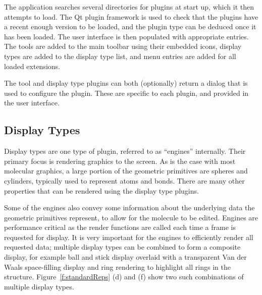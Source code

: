 \documentclass[10pt]{bmc_article}
\newenvironment{bmcformat}{\begin{raggedright}
\baselineskip20pt\sloppy\setboolean{publ}{false}}{\end{raggedright}
\baselineskip20pt\sloppy}
\begin{document}
\begin{bmcformat}
The application searches several directories for plugins at start up,
which it then attempts to load. The Qt plugin framework is used to check that
the plugins have a recent enough version to be loaded, and the plugin type can
be deduced once it has been loaded. The user interface is then populated with
appropriate entries. The tools are added to the main toolbar using their
embedded icons, display types are added to the display type list, and menu
entries are added for all loaded extensions.

The tool and display type plugins can both (optionally) return a dialog that is
used to configure the plugin. These are specific to each plugin, and provided in
the user interface.

\subsection{Display Types}

Display types are one type of plugin, referred to as ``engines'' internally. Their
primary focus is rendering graphics to the screen. As is the case with most
molecular graphics, a large portion of the geometric primitives are spheres and
cylinders, typically used to represent atoms and bonds. There are many other
properties that can be rendered using the display type plugins.

Some of the engines also convey some information about the underlying data the
geometric primitives represent, to allow for the molecule to be edited.
Engines are performance critical as the render functions are called each time a
frame is requested for display. It is very important for the engines to
efficiently render all requested data; multiple display types can be
combined to form a composite display, for example ball and stick display
overlaid with a transparent Van der Waals space-filling display and ring
rendering to highlight all rings in the structure. Figure~\ref{f:standardReps}
(d) and (f) show two such combinations of multiple display types.


\end{bmcformat}
\end{document}
